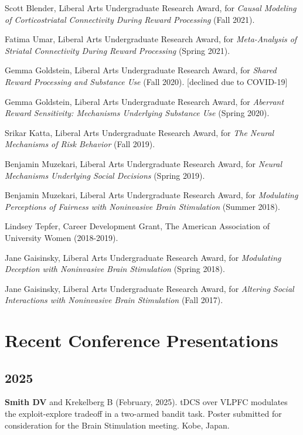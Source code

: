 \documentclass[11pt, letterpaper]{article}
\begin{document}
\begin{hangparas}{.5in}{1}
Scott Blender, Liberal Arts Undergraduate Research Award, for \textit{Causal Modeling of Corticostriatal Connectivity During Reward Processing} (Fall 2021).

Fatima Umar, Liberal Arts Undergraduate Research Award, for \textit{Meta-Analysis of Striatal Connectivity During Reward Processing} (Spring 2021).

Gemma Goldstein, Liberal Arts Undergraduate Research Award, for \textit{Shared Reward Processing and Substance Use} (Fall 2020). [declined due to COVID-19]

Gemma Goldstein, Liberal Arts Undergraduate Research Award, for \textit{Aberrant Reward Sensitivity: Mechanisms Underlying Substance Use} (Spring 2020). 

Srikar Katta, Liberal Arts Undergraduate Research Award, for \textit{The Neural Mechanisms of Risk Behavior} (Fall 2019).

Benjamin Muzekari, Liberal Arts Undergraduate Research Award, for \textit{Neural Mechanisms Underlying Social Decisions} (Spring 2019).

Benjamin Muzekari, Liberal Arts Undergraduate Research Award, for \textit{Modulating Perceptions of Fairness with Noninvasive Brain Stimulation} (Summer 2018).

Lindsey Tepfer, Career Development Grant, The American Association of University Women (2018-2019).

Jane Gaisinsky, Liberal Arts Undergraduate Research Award, for \textit{Modulating Deception with Noninvasive Brain Stimulation} (Spring 2018).

Jane Gaisinsky, Liberal Arts Undergraduate Research Award, for \textit{Altering Social Interactions with Noninvasive Brain Stimulation} (Fall 2017). \\

\end{hangparas}




\section*{Recent Conference Presentations}
\label{sec:conferences}

\subsection*{2025}
\begin{hangparas}{.5in}{1}

\textbf{Smith DV} and Krekelberg B (February, 2025). tDCS over VLPFC modulates the exploit-explore tradeoff in a two-armed bandit task.  Poster submitted for consideration for the Brain Stimulation meeting. Kobe, Japan. \\


\end{hangparas}
\end{document}
